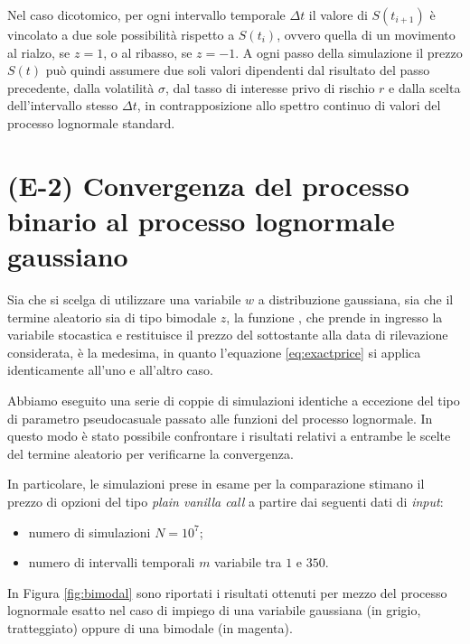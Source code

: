 Nel caso dicotomico, per ogni intervallo temporale $\Delta t$ il valore di $S(t_{i + 1})$ è vincolato a due sole possibilità rispetto a $S(t_i)$, ovvero quella di un movimento al rialzo, se $z = 1$, o al ribasso, se $z = -1$. A ogni passo della simulazione il prezzo $S(t)$ può quindi assumere due soli valori dipendenti dal risultato del passo precedente, dalla volatilità $\sigma$, dal tasso di interesse privo di rischio $r$ e dalla scelta dell'intervallo stesso $\Delta t$, in contrapposizione allo spettro continuo di valori del processo lognormale standard.

\section{(E-2) Convergenza del processo binario al processo lognormale gaussiano}

Sia che si scelga di utilizzare una variabile $w$ a distribuzione gaussiana, sia che il termine aleatorio sia di tipo bimodale $z$, la funzione , che prende in ingresso la variabile stocastica e restituisce il prezzo del sottostante alla data di rilevazione considerata, è la medesima, in quanto l'equazione \eqref{eq:exactprice} si applica identicamente all'uno e all'altro caso. 

Abbiamo eseguito una serie di coppie di simulazioni identiche a eccezione del tipo di parametro pseudocasuale passato alle funzioni del processo lognormale. In questo modo è stato possibile confrontare i risultati relativi a entrambe le scelte del termine aleatorio per verificarne la convergenza.

In particolare, le simulazioni prese in esame per la comparazione stimano il prezzo di opzioni del tipo \textit{plain vanilla call} a partire dai seguenti dati di \textit{input}:
\begin{itemize}
    \item numero di simulazioni $N={10}^7$;
    \item numero di intervalli temporali $m$ variabile tra $1$ e $350$.
\end{itemize}
In Figura \ref{fig:bimodal} sono riportati i risultati ottenuti per mezzo del processo lognormale esatto nel caso di impiego di una variabile gaussiana (in grigio, tratteggiato) oppure di una bimodale (in magenta).

